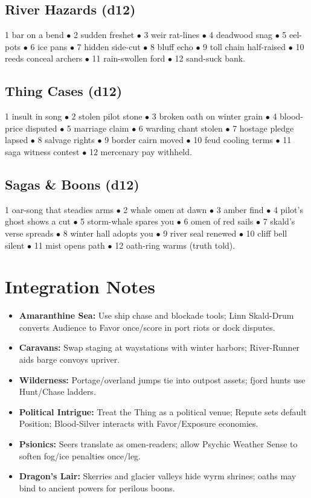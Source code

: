 \documentclass[11pt]{article}
\begin{document}
\subsection{River Hazards (d12)}

1 bar on a bend $\bullet$ 2 sudden freshet $\bullet$ 3 weir rat-lines $\bullet$ 4 deadwood snag $\bullet$ 5 eel-pots $\bullet$ 6 ice pans $\bullet$ 7 hidden side-cut $\bullet$ 8 bluff echo $\bullet$ 9 toll chain half-raised $\bullet$ 10 reeds conceal archers $\bullet$ 11 rain-swollen ford $\bullet$ 12 sand-suck bank.

\subsection{Thing Cases (d12)}

1 insult in song $\bullet$ 2 stolen pilot stone $\bullet$ 3 broken oath on winter grain $\bullet$ 4 blood-price disputed $\bullet$ 5 marriage claim $\bullet$ 6 warding chant stolen $\bullet$ 7 hostage pledge lapsed $\bullet$ 8 salvage rights $\bullet$ 9 border cairn moved $\bullet$ 10 feud cooling terms $\bullet$ 11 saga witness contest $\bullet$ 12 mercenary pay withheld.

\subsection{Sagas \& Boons (d12)}

1 oar-song that steadies arms $\bullet$ 2 whale omen at dawn $\bullet$ 3 amber find $\bullet$ 4 pilot's ghost shows a cut $\bullet$ 5 storm-whale spares you $\bullet$ 6 omen of red sails $\bullet$ 7 skald's verse spreads $\bullet$ 8 winter hall adopts you $\bullet$ 9 river seal renewed $\bullet$ 10 cliff bell silent $\bullet$ 11 mist opens path $\bullet$ 12 oath-ring warms (truth told).

\section{Integration Notes}
\begin{itemize}
\item \textbf{Amaranthine Sea:} Use ship chase and blockade tools; Linn Skald-Drum converts Audience to Favor once/score in port riots or dock disputes.
\item \textbf{Caravans:} Swap staging at waystations with winter harbors; River-Runner aids barge convoys upriver.
\item \textbf{Wilderness:} Portage/overland jumps tie into outpost assets; fjord hunts use Hunt/Chase ladders.
\item \textbf{Political Intrigue:} Treat the Thing as a political venue; Repute sets default Position; Blood-Silver interacts with Favor/Exposure economies.
\item \textbf{Psionics:} Seers translate as omen-readers; allow Psychic Weather Sense to soften fog/ice penalties once/leg.
\item \textbf{Dragon's Lair:} Skerries and glacier valleys hide wyrm shrines; oaths may bind to ancient powers for perilous boons.
\end{itemize}
\end{document}

